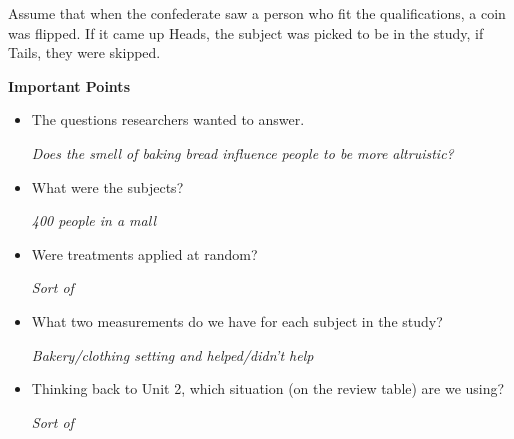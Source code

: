 Assume that when the confederate saw a person who fit the qualifications, a
coin was flipped. If it came up Heads, the subject was picked to be in
the study, if Tails, they were skipped.


\begin{center}
  {\large\bf Important Points}
\end{center}


\begin{itemize}
\item  The questions researchers wanted to answer.
\begin{students}
 \vspace{.8cm}
\end{students}

\begin{key}
{\it Does the smell of baking bread influence people to be more altruistic?}
\end{key}


\item What were the subjects?
\begin{students}
 \vspace{.8cm}
\end{students}

\begin{key}
{\it 400 people in a mall}
\end{key}



\item Were treatments applied at random?
\begin{students}
 \vspace{.8cm}
\end{students}

\begin{key}
 {\it Sort of}
\end{key}

\item What two measurements do we have for each subject in the study?
\begin{students}
 \vspace{.8cm}
\end{students}

\begin{key}
 {\it Bakery/clothing setting and helped/didn't help}
\end{key}

\item Thinking back to Unit 2, which situation (on the review table)
  are we using?
\begin{students}
 \vspace{.8cm}
\end{students}

\begin{key}
 {\it Sort of}
\end{key}




\end{itemize}



